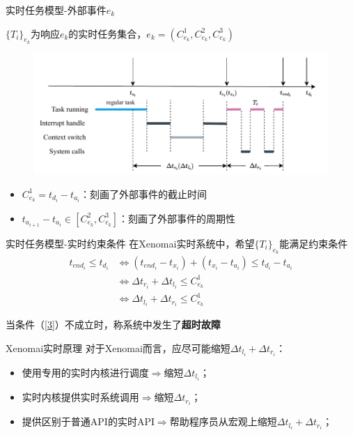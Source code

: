 \documentclass{beamer}
\begin{document}
\begin{frame}{实时任务模型-外部事件$e_k$}
    \begin{center}
        $\{T_i\}_{e_k}$为响应$e_k$的实时任务集合，$e_k=(C_{e_{k}}^1,C_{e_{k}}^2,C_{e_{k}}^3)$
    \end{center}
    \begin{figure}[h]
        \centering
        \includegraphics[height=.45\textheight]{img/Img/time-line.pdf}
    \end{figure}
    \begin{itemize}
        \item $C_{e_{k}}^1 = t_{d_i}-t_{a_i}$：刻画了外部事件的截止时间
        \item $t_{a_{i+1}}-t_{a_i}\in [C_{e_{k}}^2,C_{e_{k}}^3]$：刻画了外部事件的周期性
    \end{itemize}
\end{frame}

\begin{frame}{实时任务模型-实时约束条件}
    在Xenomai实时系统中，希望$\{T_i\}_{e_k}$能满足约束条件
\begin{align}
    t_{end_i} \le t_{d_i} &\Leftrightarrow (t_{end_i} - t_{x_i}) + (t_{x_i} - t_{a_i}) \le t_{d_i} - t_{a_i} \\
    &\Leftrightarrow \Delta t_{r_i} + \Delta t_{l_i} \le C_{e_k}^1 \\
    &\Leftrightarrow \Delta t_{l_i} + \Delta t_{r_i} \le C_{e_k}^1\label{3}
\end{align}

当条件（\ref{3}）不成立时，称系统中发生了\textbf{超时故障}
    
\end{frame}

\begin{frame}{Xenomai实时原理}
    对于Xenomai而言，应尽可能缩短$\Delta t_{l_i} + \Delta t_{r_i}$：
    \begin{itemize}
        \item 使用专用的实时内核进行调度$\Rightarrow$缩短$\Delta t_{l_i}$；
        \item 实时内核提供实时系统调用$\Rightarrow$缩短$\Delta t_{r_i}$；
        \item 提供区别于普通API的实时API$\Rightarrow$帮助程序员从宏观上缩短$\Delta t_{l_i} + \Delta t_{r_i}$；
    \end{itemize}
\end{frame}
\end{document}
